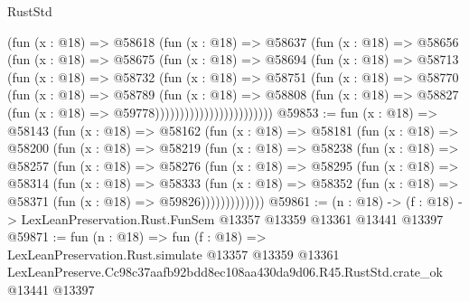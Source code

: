 \begin{lexlean}{RustStd}
\begin{coremodule}
                          (fun (x : @18) =>
                          @58618
                            (fun (x : @18) =>
                            @58637
                              (fun (x : @18) =>
                              @58656
                                (fun (x : @18) =>
                                @58675
                                  (fun (x : @18) =>
                                  @58694
                                    (fun (x : @18) =>
                                    @58713
                                      (fun (x : @18) =>
                                      @58732
                                        (fun (x : @18) =>
                                        @58751
                                          (fun (x : @18) =>
                                          @58770
                                            (fun (x : @18) =>
                                            @58789
                                              (fun (x : @18) =>
                                              @58808
                                                (fun (x : @18) =>
                                                @58827
                                                  (fun (x : @18) => @59778))))))))))))))))))))))))
@59853 := fun (x : @18) =>
  @58143
    (fun (x : @18) =>
    @58162
      (fun (x : @18) =>
      @58181
        (fun (x : @18) =>
        @58200
          (fun (x : @18) =>
          @58219
            (fun (x : @18) =>
            @58238
              (fun (x : @18) =>
              @58257
                (fun (x : @18) =>
                @58276
                  (fun (x : @18) =>
                  @58295
                    (fun (x : @18) =>
                    @58314
                      (fun (x : @18) =>
                      @58333
                        (fun (x : @18) =>
                        @58352 (fun (x : @18) => @58371 (fun (x : @18) => @59826)))))))))))))
@59861 := (n : @18) ->
  (f : @18) -> LexLeanPreservation.Rust.FunSem @13357 @13359 @13361 @13441 @13397
@59871 := fun (n : @18) =>
  fun (f : @18) =>
  LexLeanPreservation.Rust.simulate
    @13357
    @13359
    @13361
    LexLeanPreserve.Cc98c37aafb92bdd8ec108aa430da9d06.R45.RustStd.crate_ok
    @13441
    @13397
\end{coremodule}
\end{lexlean}
